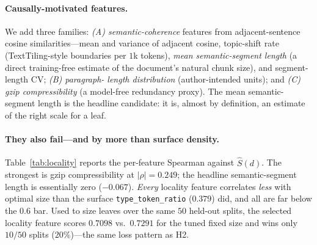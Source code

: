 \documentclass[11pt]{article}
\begin{document}
\paragraph{Causally-motivated features.} We add three families: \emph{(A)
semantic-coherence} features from adjacent-sentence cosine similarities---mean and
variance of adjacent cosine, topic-shift rate (TextTiling-style boundaries per
$1$k tokens), \emph{mean semantic-segment length} (a direct training-free estimate
of the document's natural chunk size), and segment-length CV; \emph{(B) paragraph-
length distribution} (author-intended units); and \emph{(C) gzip compressibility}
(a model-free redundancy proxy). The mean semantic-segment length is the headline
candidate: it is, almost by definition, an estimate of the right scale for a leaf.

\paragraph{They also fail---and by more than surface density.}
Table~\ref{tab:locality} reports the per-feature Spearman against $\hat S(d)$. The
strongest is gzip compressibility at $|\rho|=0.249$; the headline semantic-segment
length is essentially zero ($-0.067$). \emph{Every} locality feature correlates
\emph{less} with optimal size than the surface \texttt{type\_token\_ratio}
($0.379$) did, and all are far below the $0.6$ bar. Used to size leaves over the
same $50$ held-out splits, the selected locality feature scores $0.7098$ vs.\
$0.7291$ for the tuned fixed size and wins only $10/50$ splits ($20\%$)---the same
loss pattern as H2.
\end{document}
